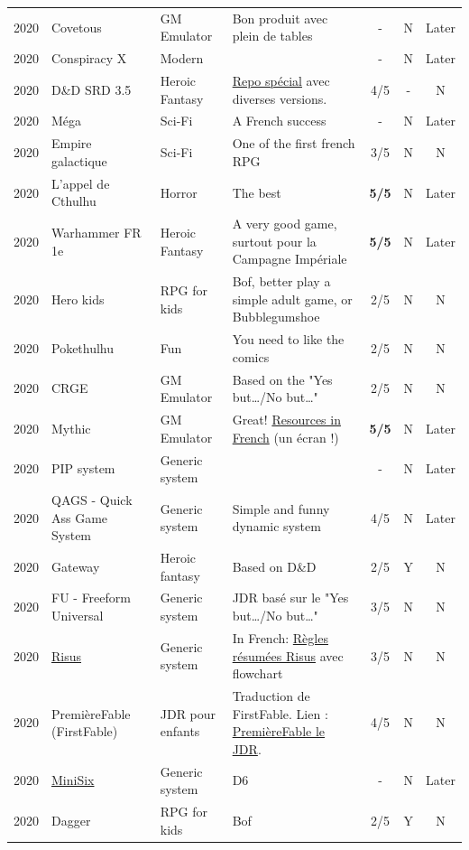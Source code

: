 \documentclass[a4paper, 11pt, twoside]{article}
\begin{document}
\begin{longtable}{cp{2cm}p{1.5cm}p{7cm}ccc}
2020 & Covetous & GM Emulator & Bon produit avec plein de tables & - & N & Later\\
2020 & Conspiracy X & Modern &  & - & N & Later\\
2020 & D\&D SRD 3.5 & Heroic Fantasy & \href{https://github.com/orey/srd-3.5}{Repo spécial} avec diverses versions. & 4/5 & - & N\\
2020 & Méga & Sci-Fi & A French success & - & N & Later\\
2020 & Empire galactique & Sci-Fi & One of the first french RPG & 3/5 & N & N\\
2020 & L'appel de Cthulhu & Horror & The best & \textbf{5/5} & N & Later\\
2020 & Warhammer FR 1e & Heroic Fantasy & A very good game, surtout pour la Campagne Impériale & \textbf{5/5} & N & Later\\
2020 & Hero kids & RPG for kids & Bof, better play a simple adult game, or Bubblegumshoe & 2/5 & N & N\\
2020 & Pokethulhu & Fun & You need to like the comics & 2/5 & N & N\\
2020 & CRGE & GM Emulator & Based on the "Yes but\ldots{}/No but\ldots{}" & 2/5 & N & N\\
2020 & Mythic & GM Emulator & Great! \href{https://github.com/orey/jdr/tree/master/Mythic-fr}{Resources in French} (un écran !) & \textbf{5/5} & N & Later\\
2020 & PIP system & Generic system &  & - & N & Later\\
2020 & QAGS - Quick Ass Game System & Generic system & Simple and funny dynamic system & 4/5 & N & Later\\
2020 & Gateway & Heroic fantasy & Based on D\&D & 2/5 & Y & N\\
2020 & FU - Freeform Universal & Generic system & JDR basé sur le "Yes but\ldots{}/No but\ldots{}" & 3/5 & N & N\\
2020 & \href{https://github.com/orey/jdr/tree/master/Risus-fr}{Risus} & Generic system & In French:  \href{https://github.com/orey/jdr/tree/master/Risus-fr}{Règles résumées Risus} avec flowchart & 3/5 & N & N\\
2020 & PremièreFable (FirstFable) & JDR pour enfants & Traduction de FirstFable. Lien : \href{https://orey.github.io/premierefable/}{PremièreFable le JDR}. & 4/5 & N & N\\
2020 & \href{https://www.drivethrurpg.com/product/144558/Mini-Six-Bare-Bones-Edition}{MiniSix} & Generic system & D6 & - & N & Later\\
2020 & Dagger & RPG for kids & Bof & 2/5 & Y & N\\
\end{longtable}
\end{document}
